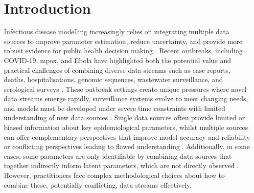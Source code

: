 \documentclass{article}
\begin{document}
\section{Introduction}

Infectious disease modelling increasingly relies on integrating multiple data sources to improve parameter estimation, reduce uncertainty, and provide more robust evidence for public health decision making \citep{deangelis2018analysing}.
Recent outbreaks, including COVID-19, mpox, and Ebola have highlighted both the potential value and practical challenges of combining diverse data streams such as case reports, deaths, hospitalisations, genomic sequences, wastewater surveillance, and serological surveys \citep{knock2021key, ro2025estimating, Abbott2021-delta, Abbott2022-prevalence, Ward2024-sp,birrell2025real}.
These outbreak settings create unique pressures where novel data streams emerge rapidly, surveillance systems evolve to meet changing needs, and models must be developed under severe time constraints with limited understanding of new data sources \citep{mccaw2023role}.
Single data sources often provide limited or biased information about key epidemiological parameters, whilst multiple sources can offer complementary perspectives that improve model accuracy and reliability or conflicting perspectives leading to flawed understanding \citep{lison2024generative, sherratt2021exploring}.
Additionally, in some cases, some parameters are only identifiable by combining data sources that together indirectly inform latent parameters, which are not directly observed \citep{deangelis2018analysing}.
However, practitioners face complex methodological choices about how to combine these, potentially conflicting, data streams effectively.
\end{document}
